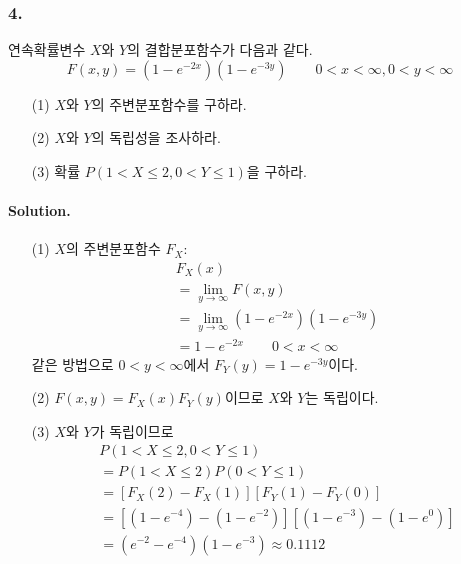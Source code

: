\subsubsection{4.} 연속확률변수 $X$와 $Y$의 결합분포함수가 다음과 같다. \[F\left(x, y\right)=\left(1-e^{-2x}\right)\left(1-e^{-3y}\right)\qquad 0<x<\infty, 0<y<\infty\]

\begin{itemize}
  \item [(1)] $X$와 $Y$의 주변분포함수를 구하라.
  \item [(2)] $X$와 $Y$의 독립성을 조사하라.
  \item [(3)] 확률 $P\left(1<X\leq 2, 0<Y\leq 1\right)$을 구하라.
\end{itemize}

\paragraph{Solution.} 
\begin{itemize}
  \item [(1)] $X$의 주변분포함수 $F_X$:
\begin{align*}
	&F_X\left(x\right) \\
	&= \lim_{y\rightarrow\infty} F\left(x, y\right) \\
	&= \lim_{y\rightarrow\infty} \left(1-e^{-2x}\right)\left(1-e^{-3y}\right) \\
	&= 1-e^{-2x} \qquad 0<x<\infty
\end{align*}
같은 방법으로 $0<y<\infty$에서 $F_Y\left(y\right)=1-e^{-3y}$이다.

  \item [(2)] $F\left(x, y\right)=F_X\left(x\right)F_Y\left(y\right)$이므로 $X$와 $Y$는 독립이다.
  \item [(3)] $X$와 $Y$가 독립이므로
\begin{align*}
	&P\left(1<X\leq 2, 0<Y\leq 1\right) \\
	&= P\left(1<X\leq 2\right)P\left(0<Y\leq 1\right) \\
	&= \left[F_X\left(2\right)-F_X\left(1\right)\right]\left[F_Y\left(1\right)-F_Y\left(0\right)\right]\\
	&= \left[\left(1-e^{-4}\right)-\left(1-e^{-2}\right)\right]\left[\left(1-e^{-3}\right)-\left(1-e^{0}\right)\right]\\
	&= \left(e^{-2}-e^{-4}\right)\left(1-e^{-3}\right) \approx 0.1112
\end{align*}
\end{itemize}

